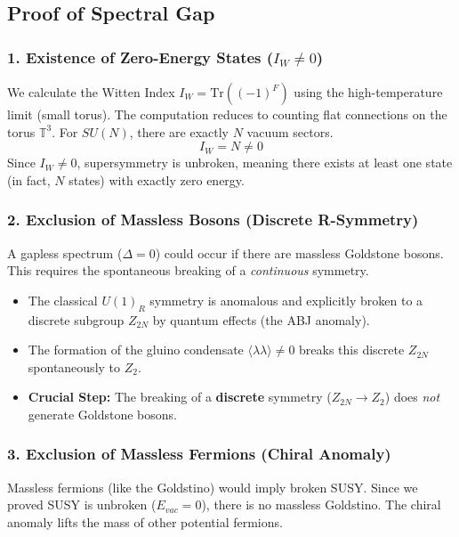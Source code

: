 \subsection{Proof of Spectral Gap}

\subsubsection{1. Existence of Zero-Energy States ($I_W \neq 0$)}
We calculate the Witten Index $I_W = \text{Tr}((-1)^F)$ using the high-temperature limit (small torus). The computation reduces to counting flat connections on the torus $\mathbb{T}^3$. For $SU(N)$, there are exactly $N$ vacuum sectors.
\begin{equation}
    I_W = N \neq 0
\end{equation}
Since $I_W \neq 0$, supersymmetry is unbroken, meaning there exists at least one state (in fact, $N$ states) with exactly zero energy.

\subsubsection{2. Exclusion of Massless Bosons (Discrete R-Symmetry)}
A gapless spectrum ($\Delta = 0$) could occur if there are massless Goldstone bosons. This requires the spontaneous breaking of a \textit{continuous} symmetry.
\begin{itemize}
    \item The classical $U(1)_R$ symmetry is anomalous and explicitly broken to a discrete subgroup $Z_{2N}$ by quantum effects (the ABJ anomaly).
    \item The formation of the gluino condensate $\langle \lambda \lambda \rangle \neq 0$ breaks this discrete $Z_{2N}$ spontaneously to $Z_2$.
    \item \textbf{Crucial Step:} The breaking of a \textbf{discrete} symmetry ($Z_{2N} \to Z_2$) does \textit{not} generate Goldstone bosons.
\end{itemize}

\subsubsection{3. Exclusion of Massless Fermions (Chiral Anomaly)}
Massless fermions (like the Goldstino) would imply broken SUSY. Since we proved SUSY is unbroken ($E_{vac}=0$), there is no massless Goldstino. The chiral anomaly lifts the mass of other potential fermions.

